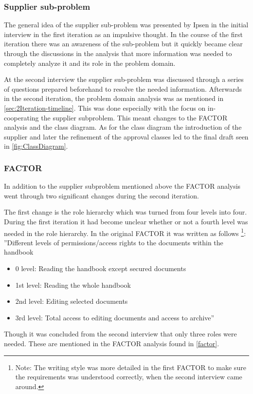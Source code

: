 \subsubsection*{Supplier sub-problem} 
The general idea of the supplier sub-problem was presented by Ipsen in the initial interview in the first iteration as an impulsive thought.
In the course of the first iteration there was an awareness of the sub-problem but it quickly became clear through the discussions in the analysis that more information was needed to completely analyze it and its role in the problem domain.

At the second interview the supplier sub-problem was discussed through a series of questions prepared beforehand to resolve the needed information.
Afterwards in the second iteration, the problem domain analysis was as mentioned in \cref{sec:2Iteration-timeline}. 
This was done especially with the focus on in-cooperating the supplier subproblem.
This meant changes to the FACTOR analysis and the class diagram.
As for the class diagram the introduction of the supplier and later the refinement of the approval classes led to the final draft seen in \cref{fig:ClassDiagram}.

\subsubsection*{FACTOR}
In addition to the supplier subproblem mentioned above the FACTOR analysis went through two significant changes during the second iteration.

The first change is the role hierarchy which was turned from four levels into four. 
During the first iteration it had become unclear whether or not a fourth level was needed in the role hierarchy.
In the original FACTOR it was written as follows
\footnote{Note: The writing style was more detailed in the first FACTOR to make sure the requirements was understood correctly, when the second interview came around.}:
\newline
''Different levels of permissions/access rights to the documents within the handbook
\begin{itemize}
	\item 
	0 level:
	Reading the handbook except secured documents
	\item 
	1st level:
	Reading the whole handbook
	\item 
	2nd level:
	Editing selected documents
	\item 
	3rd level:
	Total access to editing documents and access to archive''
\end{itemize}
Though it was concluded from the second interview that only three roles were needed.
These are mentioned in the FACTOR analysis found in \cref{factor}.

